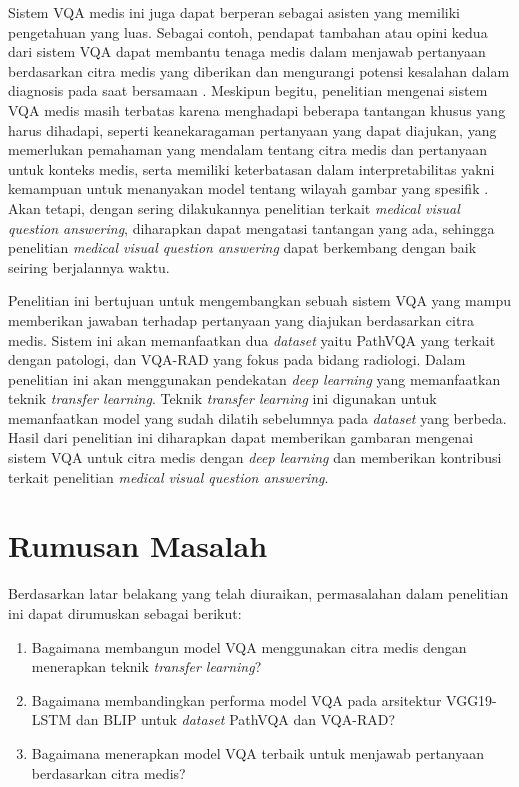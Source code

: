 \par Sistem VQA medis ini juga dapat berperan sebagai asisten yang memiliki pengetahuan yang luas. Sebagai contoh, pendapat tambahan atau opini kedua dari sistem VQA dapat membantu tenaga medis dalam menjawab pertanyaan berdasarkan citra medis yang diberikan dan mengurangi potensi kesalahan dalam diagnosis pada saat bersamaan \citep{tschandl2020human}. Meskipun begitu, penelitian mengenai sistem VQA medis masih terbatas karena menghadapi beberapa tantangan khusus yang harus dihadapi, seperti keanekaragaman pertanyaan yang dapat diajukan, yang memerlukan pemahaman yang mendalam tentang citra medis dan pertanyaan untuk konteks medis, serta memiliki keterbatasan dalam interpretabilitas yakni kemampuan untuk menanyakan model tentang wilayah gambar yang spesifik \citep{lin2023medical}. Akan tetapi, dengan sering dilakukannya penelitian terkait \textit{medical visual question answering}, diharapkan dapat mengatasi tantangan yang ada, sehingga penelitian \textit{medical visual question answering} dapat berkembang dengan baik seiring berjalannya waktu.

\par Penelitian ini bertujuan untuk mengembangkan sebuah sistem VQA yang mampu memberikan jawaban terhadap pertanyaan yang diajukan berdasarkan citra medis. Sistem ini akan memanfaatkan dua \textit{dataset} yaitu PathVQA yang terkait dengan patologi, dan VQA-RAD yang fokus pada bidang radiologi. Dalam penelitian ini akan menggunakan pendekatan \textit{deep learning} yang memanfaatkan teknik \textit{transfer learning}. Teknik \textit{transfer learning} ini digunakan untuk memanfaatkan model yang sudah dilatih sebelumnya pada \textit{dataset} yang berbeda. Hasil dari penelitian ini diharapkan dapat memberikan gambaran mengenai sistem VQA untuk citra medis dengan \textit{deep learning} dan memberikan kontribusi terkait penelitian \textit{medical visual question answering}.

\section{Rumusan Masalah}
Berdasarkan latar belakang yang telah diuraikan, permasalahan dalam penelitian ini dapat dirumuskan sebagai berikut:
\begin{enumerate}

	\item{Bagaimana membangun model VQA menggunakan citra medis dengan menerapkan teknik \textit{transfer learning}?}

	\item{Bagaimana membandingkan performa model VQA pada arsitektur VGG19-LSTM dan BLIP untuk \textit{dataset} PathVQA dan VQA-RAD?}

    \item{Bagaimana menerapkan model VQA terbaik untuk menjawab pertanyaan berdasarkan citra medis?}

\end{enumerate}

